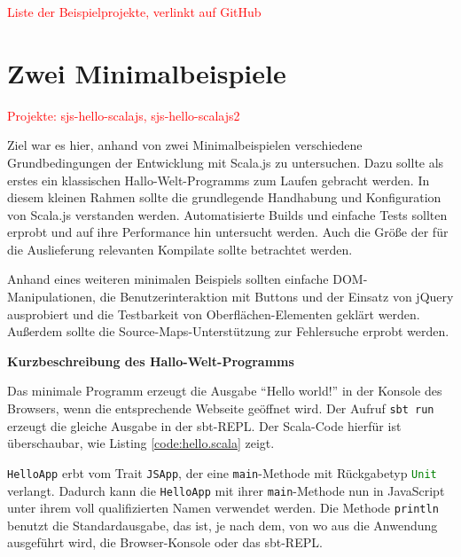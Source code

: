\documentclass[a4paper, 12pt, hidelinks, listof=totoc, listoftables=totoc, bibliography=totoc]{scrreprt}
\newcommand{\code}[1]{\lstinline[language=Scala, style=inline]|#1|}
\newcommand{\scala}[1]{\lstinline[language=Scala, style=inline]|#1|}
\newcommand{\TODO}[1]{\textcolor{red}{#1}\newline}
\newcommand{\MyMiniSec}[1]{\rmfamily\fontsize{12}{15}\selectfont
	\vspace{7pt}\textbf{#1} %
}
\begin{document}
\TODO{Liste der Beispielprojekte, verlinkt auf GitHub}




\section{Zwei Minimalbeispiele}


\TODO{Projekte: sjs-hello-scalajs, sjs-hello-scalajs2}

Ziel war es hier, anhand von zwei Minimalbeispielen verschiedene Grundbedingungen der Entwicklung mit Scala.js zu untersuchen. Dazu sollte als erstes ein klassischen Hallo-Welt-Programms zum Laufen gebracht werden. In diesem kleinen Rahmen sollte die grundlegende Handhabung und Konfiguration von Scala.js verstanden werden. Automatisierte Builds und einfache Tests sollten erprobt und auf ihre Performance hin untersucht werden. Auch die Größe der für die Auslieferung relevanten Kompilate sollte betrachtet werden.

Anhand eines weiteren minimalen Beispiels sollten einfache \ac{DOM}-Manipulationen, die Benutzerinteraktion mit Buttons und der Einsatz von jQuery ausprobiert und die Testbarkeit von Oberflächen-Elementen geklärt werden. Außerdem sollte die Source-Maps-Unterstützung zur Fehlersuche erprobt werden.


\MyMiniSec{Kurzbeschreibung des Hallo-Welt-Programms}

Das minimale Programm erzeugt die Ausgabe "`Hello world!"' in der Konsole des Browsers, wenn die entsprechende Webseite geöffnet wird. Der Aufruf \code{sbt run} erzeugt die gleiche Ausgabe in der sbt-\ac{REPL}. Der Scala-Code hierfür ist überschaubar, wie Listing \ref{code:hello.scala} zeigt.



\scala{HelloApp} erbt vom Trait \scala{JSApp}, der eine \scala{main}-Methode mit Rückgabetyp \scala{Unit} verlangt. Dadurch kann die \scala{HelloApp} mit ihrer \scala{main}-Methode nun in JavaScript unter ihrem voll qualifizierten Namen verwendet werden. Die Methode \scala{println} benutzt die Standardausgabe, das ist, je nach dem, von wo aus die Anwendung ausgeführt wird, die Browser-Konsole oder das sbt-\ac{REPL}.
\end{document}
